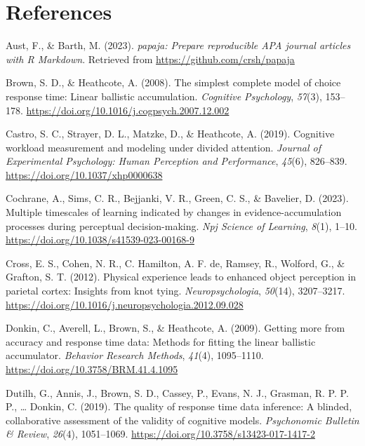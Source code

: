 \documentclass[
  man, donotrepeattitle,floatsintext]{apa6}
\newlength{\cslhangindent}
\newenvironment{CSLReferences}[2] %
 {\begin{list}{}{%
  \setlength{\itemindent}{0pt}
  \setlength{\leftmargin}{0pt}
  \setlength{\parsep}{0pt}
  \ifodd #1
   \setlength{\leftmargin}{\cslhangindent}
   \setlength{\itemindent}{-1\cslhangindent}
  \fi
  \setlength{\itemsep}{#2\baselineskip}}}
 {\end{list}}
\begin{document}
\newpage

\section{References}\label{references}

\label{refs}
\begin{CSLReferences}{1}{0}
Aust, F., \& Barth, M. (2023). \emph{{papaja}: {Prepare} reproducible {APA} journal articles with {R Markdown}}. Retrieved from \url{https://github.com/crsh/papaja}

Brown, S. D., \& Heathcote, A. (2008). The simplest complete model of choice response time: {Linear} ballistic accumulation. \emph{Cognitive Psychology}, \emph{57}(3), 153--178. \url{https://doi.org/10.1016/j.cogpsych.2007.12.002}

Castro, S. C., Strayer, D. L., Matzke, D., \& Heathcote, A. (2019). Cognitive workload measurement and modeling under divided attention. \emph{Journal of Experimental Psychology: Human Perception and Performance}, \emph{45}(6), 826--839. \url{https://doi.org/10.1037/xhp0000638}

Cochrane, A., Sims, C. R., Bejjanki, V. R., Green, C. S., \& Bavelier, D. (2023). Multiple timescales of learning indicated by changes in evidence-accumulation processes during perceptual decision-making. \emph{Npj Science of Learning}, \emph{8}(1), 1--10. \url{https://doi.org/10.1038/s41539-023-00168-9}

Cross, E. S., Cohen, N. R., C. Hamilton, A. F. de, Ramsey, R., Wolford, G., \& Grafton, S. T. (2012). Physical experience leads to enhanced object perception in parietal cortex: {Insights} from knot tying. \emph{Neuropsychologia}, \emph{50}(14), 3207--3217. \url{https://doi.org/10.1016/j.neuropsychologia.2012.09.028}

Donkin, C., Averell, L., Brown, S., \& Heathcote, A. (2009). Getting more from accuracy and response time data: {Methods} for fitting the linear ballistic accumulator. \emph{Behavior Research Methods}, \emph{41}(4), 1095--1110. \url{https://doi.org/10.3758/BRM.41.4.1095}

Dutilh, G., Annis, J., Brown, S. D., Cassey, P., Evans, N. J., Grasman, R. P. P. P., \ldots{} Donkin, C. (2019). The quality of response time data inference: A blinded, collaborative assessment of the validity of cognitive models. \emph{Psychonomic Bulletin \& Review}, \emph{26}(4), 1051--1069. \url{https://doi.org/10.3758/s13423-017-1417-2}


\end{CSLReferences}
\end{document}
